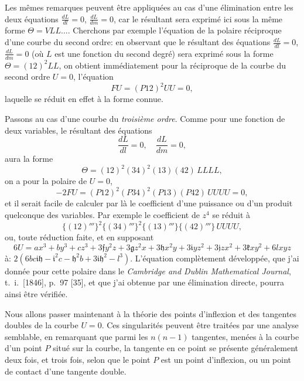 \documentclass[11pt]{article}
\begin{document}
\medskip
Les m\^emes remarques peuvent \^etre appliqu\'ees au cas d'une \'elimination entre les
deux \'equations $\tfrac{dL}{dl} = 0$, $\tfrac{dL}{dm} = 0$, car le r\'esultant sera exprim\'e ici sous la m\^eme forme
$\Theta = V L L \ldots$. Cherchons par exemple l'\'equation de la polaire r\'eciproque d'une courbe
du second ordre: en observant que le r\'esultant des \'equations $\tfrac{dL}{dl} = 0$, $\tfrac{dL}{dm} = 0$ (o\`u $L$
est une fonction du second degr\'e) sera exprim\'e sous la forme $\Theta = (12)^{2} L L$, on obtient
imm\'ediatement pour la r\'eciproque de la courbe du second ordre $U = 0$, l'\'equation
\[
F U = (P 1 2)^{2} U U = 0,
\]
laquelle se r\'eduit en effet \`a la forme connue.

\medskip
Passons au cas d'une courbe du \textit{troisi\`eme ordre}. Comme pour une fonction de
deux variables, le r\'esultant des \'equations
\[
\frac{dL}{dl} = 0, \quad \frac{dL}{dm} = 0,
\]
aura la forme
\[
\Theta = (12)^{2}(34)^{2}(13)(42)\,L L L L,
\]
on a pour la polaire de $U = 0$,
\[
-2 F U = (P 1 2)^{2}(P 3 4)^{2}(P 1 3)(P 4 2)\,U U U U = 0,
\]
et il serait facile de calculer par l\`a le coefficient d'une puissance ou d'un produit
quelconque des variables. Par exemple le coefficient de $z^{4}$ se r\'eduit \`a
\[
\{(12)'''\}^{2}\{(34)'''\}^{2}\{(13)'''\}\{(42)'''\}\,U U U U,
\]
ou, toute r\'eduction faite, et en supposant
\[
6 U = a x^{3} + b y^{3} + c z^{3} + 3 \mathfrak{f} y^{2} z + 3 \mathfrak{g} z^{2} x + 3 \mathfrak{h} x^{2} y + 3 \mathfrak{i} y z^{2} + 3 \mathfrak{j} z x^{2} + 3 \mathfrak{k} x y^{2} + 6 l x y z
\]
\`a: $2(6 b c \mathfrak{i} \mathfrak{h} - \mathfrak{i}^{2} c - \mathfrak{h}^{2} b + 3 \mathfrak{i} \mathfrak{h}^{2} - l^{3})$. L'\'equation compl\`etement d\'evelopp\'ee, que j'ai donn\'ee
pour cette polaire dans le \textit{Cambridge and Dublin Mathematical Journal}, t.~i.\ [1846], p.~97
[35], et que j'ai obtenue par une \'elimination directe, pourra ainsi \^etre v\'erifi\'ee.

\medskip
Nous allons passer maintenant \`a la th\'eorie des points d'inflexion et des tangentes
doubles de la courbe $U = 0$. Ces singularit\'es peuvent \^etre trait\'ees par une analyse
semblable, en remarquant que parmi les $n(n - 1)$ tangentes, men\'ees \`a la courbe d'un
point $P$ situ\'e sur la courbe, la tangente en ce point se pr\'esente g\'en\'eralement deux
fois, et trois fois, selon que le point $P$ est un point d'inflexion, ou un point de contact
d'une tangente double.
\end{document}
